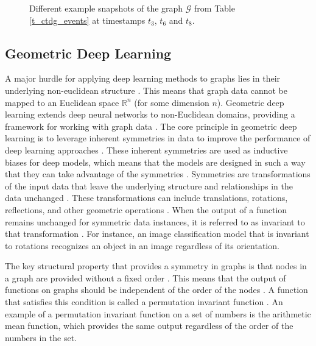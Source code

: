 \begin{figure}[ht]
    
    \caption{Different example snapshots of the graph $\mathcal{G}$ from Table \ref{t_ctdg_events} at timestamps $t_3$, $t_6$ and $t_8$.}
    \label{f_ctdg}
\end{figure}

\FloatBarrier
\subsection{Geometric Deep Learning}
\label{s_Background_GeometricDeepLearning}


A major hurdle for applying deep learning methods to graphs lies in their underlying non-euclidean structure \cite{wu_comprehensive_2021}. This means that graph data cannot be mapped to an Euclidean space $\mathbb{R}^n$ (for some dimension $n$). Geometric deep learning extends deep neural networks to non-Euclidean domains, providing a framework for working with graph data \cite{bronstein_geometric_2017, bronstein_geometric_2021}. The core principle in geometric deep learning is to leverage inherent symmetries in data to improve the performance of deep learning approaches \cite{bronstein_geometric_2021}. These inherent symmetries are used as inductive biases for deep models, which means that the models are designed in such a way that they can take advantage of the symmetries \cite{bronstein_geometric_2021}. Symmetries are transformations of the input data that leave the underlying structure and relationships in the data unchanged \cite{bronstein_geometric_2021}. These transformations can include translations, rotations, reflections, and other geometric operations \cite{bronstein_geometric_2021}. When the output of a function remains unchanged for symmetric data instances, it is referred to as invariant to that transformation \cite{bronstein_geometric_2017}. For instance, an image classification model that is invariant to rotations recognizes an object in an image regardless of its orientation. 



The key structural property that provides a symmetry in graphs is that nodes in a graph are provided without a fixed order \cite{bronstein_geometric_2021}. This means that the output of functions on graphs should be independent of the order of the nodes \cite{bronstein_geometric_2021}. A function that satisfies this condition is called a permutation invariant function \cite{bronstein_geometric_2021}. An example of a permutation invariant function on a set of numbers is the arithmetic mean function, which provides the same output regardless of the order of the numbers in the set.

